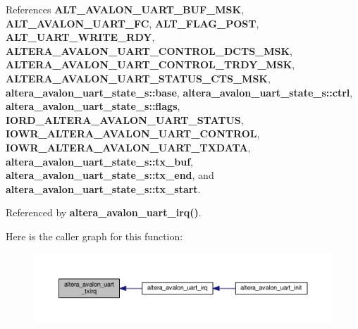 References {\bf A\+L\+T\+\_\+\+A\+V\+A\+L\+O\+N\+\_\+\+U\+A\+R\+T\+\_\+\+B\+U\+F\+\_\+\+M\+SK}, {\bf A\+L\+T\+\_\+\+A\+V\+A\+L\+O\+N\+\_\+\+U\+A\+R\+T\+\_\+\+FC}, {\bf A\+L\+T\+\_\+\+F\+L\+A\+G\+\_\+\+P\+O\+ST}, {\bf A\+L\+T\+\_\+\+U\+A\+R\+T\+\_\+\+W\+R\+I\+T\+E\+\_\+\+R\+DY}, {\bf A\+L\+T\+E\+R\+A\+\_\+\+A\+V\+A\+L\+O\+N\+\_\+\+U\+A\+R\+T\+\_\+\+C\+O\+N\+T\+R\+O\+L\+\_\+\+D\+C\+T\+S\+\_\+\+M\+SK}, {\bf A\+L\+T\+E\+R\+A\+\_\+\+A\+V\+A\+L\+O\+N\+\_\+\+U\+A\+R\+T\+\_\+\+C\+O\+N\+T\+R\+O\+L\+\_\+\+T\+R\+D\+Y\+\_\+\+M\+SK}, {\bf A\+L\+T\+E\+R\+A\+\_\+\+A\+V\+A\+L\+O\+N\+\_\+\+U\+A\+R\+T\+\_\+\+S\+T\+A\+T\+U\+S\+\_\+\+C\+T\+S\+\_\+\+M\+SK}, {\bf altera\+\_\+avalon\+\_\+uart\+\_\+state\+\_\+s\+::base}, {\bf altera\+\_\+avalon\+\_\+uart\+\_\+state\+\_\+s\+::ctrl}, {\bf altera\+\_\+avalon\+\_\+uart\+\_\+state\+\_\+s\+::flags}, {\bf I\+O\+R\+D\+\_\+\+A\+L\+T\+E\+R\+A\+\_\+\+A\+V\+A\+L\+O\+N\+\_\+\+U\+A\+R\+T\+\_\+\+S\+T\+A\+T\+US}, {\bf I\+O\+W\+R\+\_\+\+A\+L\+T\+E\+R\+A\+\_\+\+A\+V\+A\+L\+O\+N\+\_\+\+U\+A\+R\+T\+\_\+\+C\+O\+N\+T\+R\+OL}, {\bf I\+O\+W\+R\+\_\+\+A\+L\+T\+E\+R\+A\+\_\+\+A\+V\+A\+L\+O\+N\+\_\+\+U\+A\+R\+T\+\_\+\+T\+X\+D\+A\+TA}, {\bf altera\+\_\+avalon\+\_\+uart\+\_\+state\+\_\+s\+::tx\+\_\+buf}, {\bf altera\+\_\+avalon\+\_\+uart\+\_\+state\+\_\+s\+::tx\+\_\+end}, and {\bf altera\+\_\+avalon\+\_\+uart\+\_\+state\+\_\+s\+::tx\+\_\+start}.



Referenced by {\bf altera\+\_\+avalon\+\_\+uart\+\_\+irq()}.



Here is the caller graph for this function\+:
\nopagebreak
\begin{figure}[H]
\begin{center}
\leavevmode
\includegraphics[width=350pt]{d8/ddb/altera__avalon__uart__init_8c_ad76c883fc9a29c4c38e5009ecebd1aa9_icgraph}
\end{center}
\end{figure}


